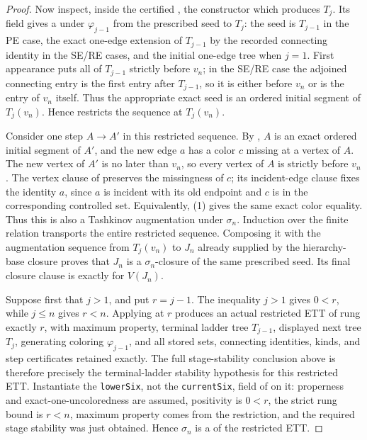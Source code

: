 \begin{proof}
Now inspect, inside the certified , the
 constructor which produces $T_j$.  Its
 field gives a
 under $\varphi_{j-1}$ from the
prescribed seed to $T_j$: the seed is $T_{j-1}$ in the PE case, the exact
one-edge extension of $T_{j-1}$ by the recorded connecting identity in
the SE/RE cases, and the initial one-edge tree when $j=1$.  First
appearance puts all of $T_{j-1}$ strictly before $v_n$; in the SE/RE case
the adjoined connecting entry is the first entry after $T_{j-1}$, so it is
either before $v_n$ or is the entry of $v_n$ itself.  Thus the appropriate
exact seed is an ordered initial segment of $T_j(v_n)$.  Hence
 restricts the sequence at
$T_j(v_n)$.

Consider one step $A\to A'$ in this restricted sequence.  By
, $A$ is an exact ordered initial segment
of $A'$, and the new edge $a$ has a color $c$ missing at a vertex of
$A$.  The new vertex of $A'$ is no later than $v_n$, so every vertex of
$A$ is strictly before $v_n$.  The vertex clause of
 preserves the missingness of $c$;
its incident-edge clause fixes the identity $a$, since $a$ is incident
with its old endpoint and $c$ is in the corresponding controlled set.
Equivalently, (1) gives the same exact color equality.  Thus this is also
a Tashkinov augmentation under $\sigma_n$.  Induction over the finite
relation  transports the entire
restricted sequence.  Composing it with the augmentation sequence from
$T_j(v_n)$ to $J_n$ already supplied by the hierarchy-base closure proves
that $J_n$ is a $\sigma_n$-closure of the same prescribed seed.  Its final
closure clause is exactly
 for $V(J_n)$.

Suppose first that $j>1$, and put $r=j-1$.  The inequality $j>1$ gives
$0<r$, while $j\leq n$ gives $r<n$.  Applying
 at $r$ produces an actual restricted
ETT of rung exactly $r$, with maximum property, terminal ladder tree
$T_{j-1}$, displayed next tree $T_j$, generating coloring
$\varphi_{j-1}$, and all stored sets, connecting identities, kinds, and
step certificates retained exactly.  The full stage-stability conclusion
above is therefore precisely the terminal-ladder stability hypothesis for
this restricted ETT.  Instantiate the \texttt{lowerSix}, not the
\texttt{currentSix}, field of  on it:
properness and exact-one-uncoloredness are assumed, positivity is $0<r$,
the strict rung bound is $r<n$, maximum property comes from the
restriction, and the required stage stability was just obtained.  Hence
$\sigma_n$ is a  of the restricted ETT.


\end{proof}
